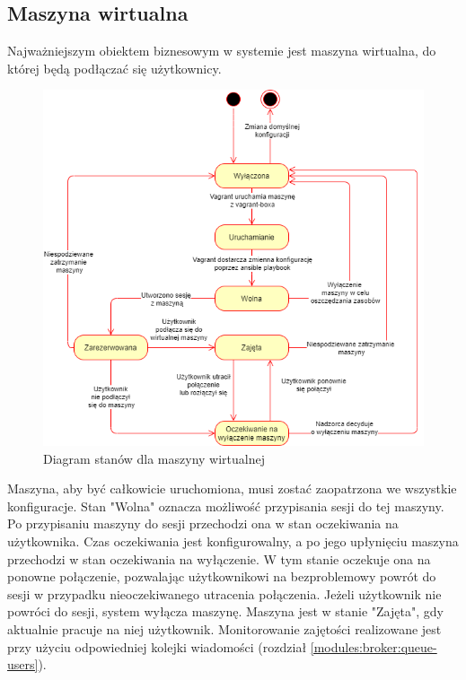 \documentclass[../opis-rozwiazania.tex]{subfiles}
\begin{document}
\label{state_diagrams}

\subsection{Maszyna wirtualna}
Najważniejszym obiektem biznesowym w systemie jest maszyna wirtualna, do której będą podłączać się użytkownicy.

\begin{figure}[H]
    \centering
    \includegraphics[width=\textwidth]{../diagrams/state_diagrams/virtual_machine.png}
    \caption{Diagram stanów dla maszyny wirtualnej}
    \label{state_vm}
\end{figure}

Maszyna, aby być całkowicie uruchomiona, musi zostać zaopatrzona we wszystkie konfiguracje.
Stan "Wolna" oznacza możliwość przypisania sesji do tej maszyny.
Po przypisaniu maszyny do sesji przechodzi ona w stan oczekiwania na użytkownika. Czas oczekiwania jest konfigurowalny, a po jego upłynięciu maszyna przechodzi w stan oczekiwania na wyłączenie.
W tym stanie oczekuje ona na ponowne połączenie, pozwalając użytkownikowi na bezproblemowy powrót do sesji w przypadku nieoczekiwanego utracenia połączenia. Jeżeli użytkownik nie powróci do sesji, system wyłącza maszynę.
Maszyna jest w stanie "Zajęta", gdy aktualnie pracuje na niej użytkownik. Monitorowanie zajętości realizowane jest przy użyciu odpowiedniej kolejki wiadomości (rozdział \ref{modules:broker:queue-users}).
\end{document}
